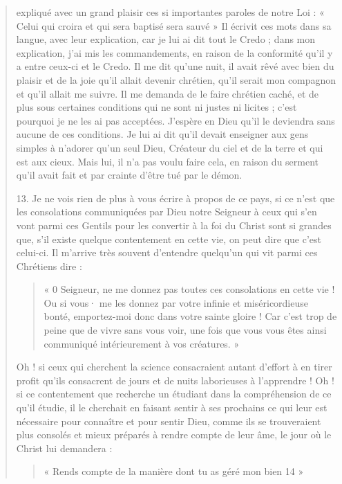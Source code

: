 \begin{quote}
  expliqué avec un grand plaisir ces si importantes paroles de notre
Loi : « Celui qui croira et qui sera baptisé sera sauvé   » Il écrivit
ces mots dans sa langue, avec leur explication, car je lui ai dit
tout le Credo ; dans mon explication, j'ai mis les commandements,
en raison de la conformité qu'il y a entre ceux-ci et le Credo. Il
me dit qu'une nuit, il avait rêvé avec bien du plaisir et de la joie
qu'il allait devenir chrétien, qu'il serait mon compagnon et qu'il
allait me suivre. Il me demanda de le faire chrétien caché, et de
plus sous certaines conditions qui ne sont ni justes ni licites ; c'est
pourquoi je ne les ai pas acceptées. J'espère en Dieu qu'il le deviendra
sans aucune de ces conditions. Je lui ai dit qu'il devait enseigner
aux gens simples à n'adorer qu'un seul Dieu, Créateur du ciel
et de la terre et qui est aux cieux. Mais lui, il n'a pas voulu faire
cela, en raison du serment qu'il avait fait et par crainte d'être tué
par le démon.


13. Je ne vois rien de plus à vous écrire à propos de ce pays, si ce n'est que les consolations communiquées par Dieu notre Seigneur
à ceux qui s'en vont parmi ces Gentils pour les convertir à
la foi du Christ sont si grandes que, s'il existe quelque contentement
en cette vie, on peut dire que c'est celui-ci. Il m'arrive très
souvent d'entendre quelqu'un qui vit parmi ces Chrétiens dire : \begin{quote}
    « 0
Seigneur, ne me donnez pas toutes ces consolations en cette vie !
Ou si vous· me les donnez par votre infinie et miséricordieuse bonté,
emportez-moi donc dans votre sainte gloire ! Car c'est trop de
peine que de vivre sans vous voir, une fois que vous vous êtes ainsi
communiqué intérieurement à vos créatures. »
\end{quote} Oh ! si ceux qui 
cherchent la science consacraient autant d'effort à en tirer profit
qu'ils consacrent de jours et de nuits laborieuses à l'apprendre !
Oh ! si ce contentement que recherche un étudiant dans la compréhension
de ce qu'il étudie, il le cherchait en faisant sentir à ses
prochains ce qui leur est nécessaire pour connaître et pour sentir
Dieu, comme ils se trouveraient plus consolés et mieux préparés
à rendre compte de leur âme, le jour où le Christ lui demandera :
\begin{quote}
    « Rends compte de la manière dont tu as géré mon bien 14 »
\end{quote}


\end{quote}
